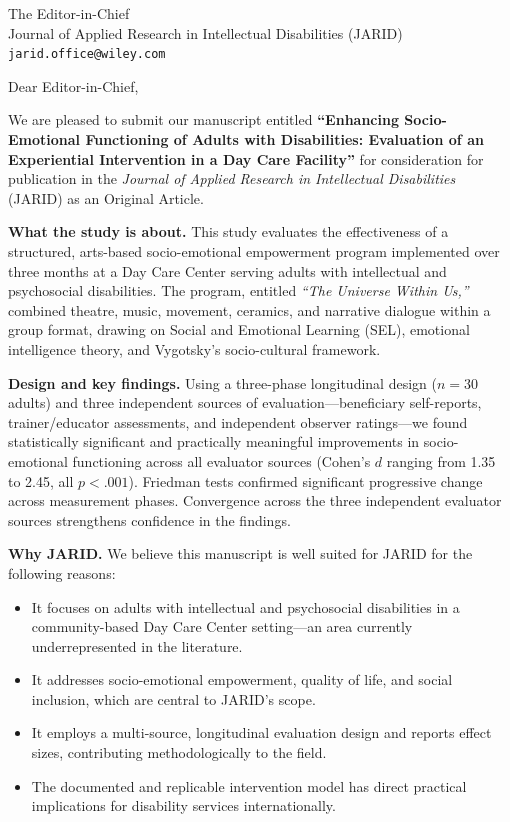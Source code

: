 \documentclass[12pt,a4paper]{letter}
\date{\today}
\begin{document}
\begin{letter}{The Editor-in-Chief\\
Journal of Applied Research in Intellectual Disabilities (JARID)\\
\texttt{jarid.office@wiley.com}}

\opening{Dear Editor-in-Chief,}

We are pleased to submit our manuscript entitled \textbf{``Enhancing
Socio-Emotional Functioning of Adults with Disabilities: Evaluation of an
Experiential Intervention in a Day Care Facility''} for consideration for
publication in the \textit{Journal of Applied Research in Intellectual
Disabilities} (JARID) as an Original Article.

\textbf{What the study is about.}
This study evaluates the effectiveness of a structured, arts-based
socio-emotional empowerment program implemented over three months at a Day Care
Center serving adults with intellectual and psychosocial disabilities. The
program, entitled \textit{``The Universe Within Us,''} combined theatre, music,
movement, ceramics, and narrative dialogue within a group format, drawing on
Social and Emotional Learning (SEL), emotional intelligence theory, and
Vygotsky's socio-cultural framework.

\textbf{Design and key findings.}
Using a three-phase longitudinal design ($n = 30$ adults) and three independent
sources of evaluation---beneficiary self-reports, trainer/educator assessments,
and independent observer ratings---we found statistically significant and
practically meaningful improvements in socio-emotional functioning across all
evaluator sources (Cohen's $d$ ranging from 1.35 to 2.45, all $p < .001$).
Friedman tests confirmed significant progressive change across measurement
phases. Convergence across the three independent evaluator sources strengthens
confidence in the findings.

\textbf{Why JARID.}
We believe this manuscript is well suited for JARID for the following reasons:
\begin{itemize}
  \item It focuses on adults with intellectual and psychosocial disabilities in a
    community-based Day Care Center setting---an area currently underrepresented
    in the literature.
  \item It addresses socio-emotional empowerment, quality of life, and social
    inclusion, which are central to JARID's scope.
  \item It employs a multi-source, longitudinal evaluation design and reports
    effect sizes, contributing methodologically to the field.
  \item The documented and replicable intervention model has direct practical
    implications for disability services internationally.
\end{itemize}


\end{letter}
\end{document}
